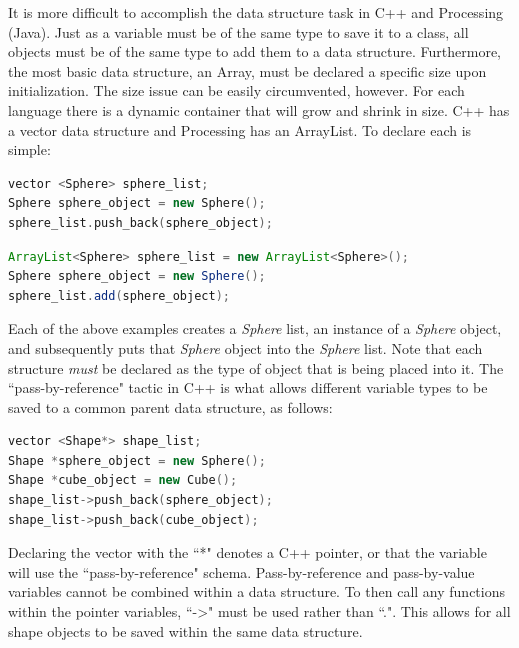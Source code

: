 It is more difficult to accomplish the data structure task in C++ and Processing (Java).  Just as a variable must be of the same type to save it to a class, all objects must be of the same type to add them to a data structure.  Furthermore, the most basic data structure, an Array, must be declared a specific size upon initialization.  The size issue can be easily circumvented, however.  For each language there is a dynamic container that will grow and shrink in size. C++ has a vector data structure and Processing has an ArrayList. To declare each is simple:
\begin{lstlisting}[language=C++, caption=C++ Vector Example, style=mystyle]
vector <Sphere> sphere_list;
Sphere sphere_object = new Sphere();
sphere_list.push_back(sphere_object);
\end{lstlisting}
\begin{lstlisting}[language=Java, caption=Java ArrayList Example, style=mystyle]
ArrayList<Sphere> sphere_list = new ArrayList<Sphere>();
Sphere sphere_object = new Sphere();
sphere_list.add(sphere_object);
\end{lstlisting}
Each of the above examples creates a \textit{Sphere} list, an instance of a \textit{Sphere} object, and subsequently puts that \textit{Sphere} object into the \textit{Sphere} list.  Note that each structure \textit{must} be declared as the type of object that is being placed into it. The ``pass-by-reference" tactic in C++ is what allows different variable types to be saved to a common parent data structure, as follows:
\begin{lstlisting}[language=C++, caption=C++ Vector Example, style=mystyle]
vector <Shape*> shape_list;
Shape *sphere_object = new Sphere();
Shape *cube_object = new Cube();
shape_list->push_back(sphere_object);
shape_list->push_back(cube_object);
\end{lstlisting}
Declaring the vector with the ``*" denotes a C++ pointer, or that the variable will use the ``pass-by-reference" schema.  Pass-by-reference and pass-by-value variables cannot be combined within a data structure.  To then call any functions within the pointer variables, ``-\textgreater" must be used rather than ``.".  This allows for all shape objects to be saved within the same data structure.

